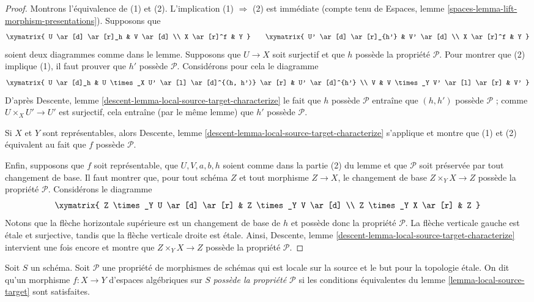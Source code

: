 \begin{proof}
Montrons l'équivalence de (1) et (2).
L'implication (1) $\Rightarrow$ (2) est immédiate (compte tenu de
Espaces, lemme \ref{spaces-lemma-lift-morphism-presentations}).
Supposons que
$$
\xymatrix{
U \ar[d] \ar[r]_h & V \ar[d] \\
X \ar[r]^f & Y
}
\quad\quad
\xymatrix{
U' \ar[d] \ar[r]_{h'} & V' \ar[d] \\
X \ar[r]^f & Y
}
$$
soient deux diagrammes comme dans le lemme. Supposons que $U \to X$ soit
surjectif et que $h$ possède la propriété $\mathcal{P}$. Pour montrer que (2)
implique (1), il faut prouver que $h'$ possède $\mathcal{P}$. Considérons
pour cela le diagramme
$$
\xymatrix{
U \ar[d]_h &
U \times_X U' \ar[l] \ar[d]^{(h, h')} \ar[r] &
U' \ar[d]^{h'} \\
V &
V \times_Y V' \ar[l] \ar[r] &
V'
}
$$
D'après
Descente, lemme \ref{descent-lemma-local-source-target-characterize}
le fait que $h$ possède $\mathcal{P}$ entraîne que $(h, h')$ possède $\mathcal{P}$ ;
comme $U \times_X U' \to U'$ est surjectif, cela entraîne (par le même
lemme) que $h'$ possède $\mathcal{P}$.

\medskip\noindent
Si $X$ et $Y$ sont représentables, alors
Descente, lemme \ref{descent-lemma-local-source-target-characterize}
s'applique et montre que (1) et (2) équivalent au fait que $f$ possède
$\mathcal{P}$.

\medskip\noindent
Enfin, supposons que $f$ soit représentable, que $U, V, a, b, h$ soient
comme dans la partie (2) du lemme et que $\mathcal{P}$ soit préservée par
tout changement de base. Il faut montrer que, pour tout schéma
$Z$ et tout morphisme $Z \to X$, le changement de base $Z \times_Y X \to Z$
possède la propriété $\mathcal{P}$. Considérons le diagramme
$$
\xymatrix{
Z \times_Y U \ar[d] \ar[r] &
Z \times_Y V \ar[d] \\
Z \times_Y X \ar[r] &
Z
}
$$
Notons que la flèche horizontale supérieure est un changement de base de $h$
et possède donc la propriété $\mathcal{P}$. La flèche verticale gauche est étale
et surjective, tandis que la flèche verticale droite est étale. Ainsi,
Descente, lemme \ref{descent-lemma-local-source-target-characterize}
intervient une fois encore et montre que $Z \times_Y X \to Z$
possède la propriété $\mathcal{P}$.
\end{proof}

\begin{definition}
\label{definition-P}
Soit $S$ un schéma.
Soit $\mathcal{P}$ une propriété de morphismes de schémas
qui est locale sur la source et le but pour la topologie étale.
On dit qu'un morphisme $f : X \to Y$ d'espaces algébriques sur $S$
{\it possède la propriété $\mathcal{P}$} si les conditions équivalentes du
lemme \ref{lemma-local-source-target}
sont satisfaites.
\end{definition}

